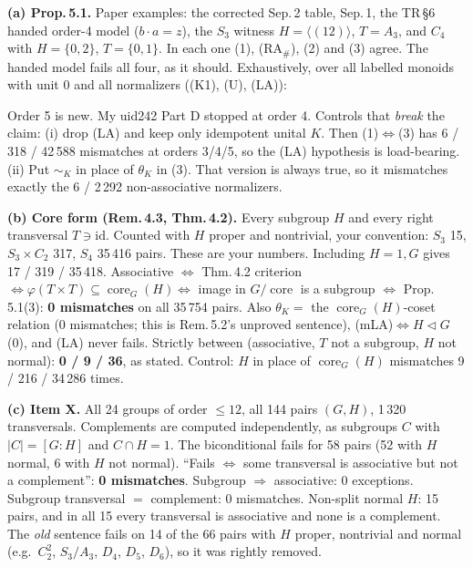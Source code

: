 \documentclass[11pt]{article}
\newcommand{\core}{\operatorname{core}}
\begin{document}
\textbf{(a) Prop.\,5.1.} Paper examples: the corrected Sep.\,2 table, Sep.\,1, the TR\,\S6 handed order-4 model ($b\cdot a=z$),
the $S_3$ witness $H=\langle(12)\rangle$, $T=A_3$, and $C_4$ with $H=\{0,2\}$, $T=\{0,1\}$. In each one (1), (RA$_\#$), (2) and (3) agree. The handed model
fails all four, as it should. Exhaustively, over all labelled monoids with unit $0$ and all normalizers ((K1), (U), (LA)):
{\small
\begin{center}\end{center}}
Order 5 is new. My uid242 Part D stopped at order 4. Controls that \emph{break} the claim: (i) drop (LA) and keep only idempotent unital $K$.
Then (1)$\Leftrightarrow$(3) has 6 / 318 / 42\,588 mismatches at orders 3/4/5, so the (LA) hypothesis is load-bearing.
(ii) Put ${\sim_K}$ in place of $\theta_K$ in (3). That version is always true, so it mismatches exactly the 6 / 2\,292 non-associative normalizers.

\textbf{(b) Core form (Rem.\,4.3, Thm.\,4.2).} Every subgroup $H$ and every right transversal $T\ni\mathrm{id}$. Counted with $H$ proper and nontrivial,
your convention: $S_3$ 15, $S_3{\times}C_2$ 317, $S_4$ 35\,416 pairs. These are your numbers. Including $H=1,G$ gives 17 / 319 / 35\,418.
Associative $\iff$ Thm.\,4.2 criterion $\iff\varphi(T{\times}T)\subseteq\core_G(H)\iff$ image in $G/\core$ is a subgroup $\iff$ Prop.\,5.1(3):
\textbf{0 mismatches} on all 35\,754 pairs. Also $\theta_K=$ the $\core_G(H)$-coset relation (0 mismatches; this is Rem.\,5.2's unproved sentence),
(mLA)$\iff H\lhd G$ (0), and (LA) never fails. Strictly between (associative, $T$ not a subgroup, $H$ not normal): \textbf{0 / 9 / 36}, as stated.
Control: $H$ in place of $\core_G(H)$ mismatches 9 / 216 / 34\,286 times.

\textbf{(c) Item X.} All 24 groups of order ${\le}12$, all 144 pairs $(G,H)$, 1\,320 transversals. Complements are computed independently,
as subgroups $C$ with $|C|=[G{:}H]$ and $C\cap H=1$. The biconditional fails for 58 pairs (52 with $H$ normal, 6 with $H$ not normal).
``Fails $\iff$ some transversal is associative but not a complement'': \textbf{0 mismatches}. Subgroup $\Rightarrow$ associative: 0 exceptions.
Subgroup transversal $=$ complement: 0 mismatches. Non-split normal $H$: 15 pairs, and in all 15 every transversal is associative and none is a complement.
The \emph{old} sentence fails on 14 of the 66 pairs with $H$ proper, nontrivial and normal (e.g.\ $C_2^2$, $S_3/A_3$, $D_4$, $D_5$, $D_6$), so it was rightly removed.
\end{document}
